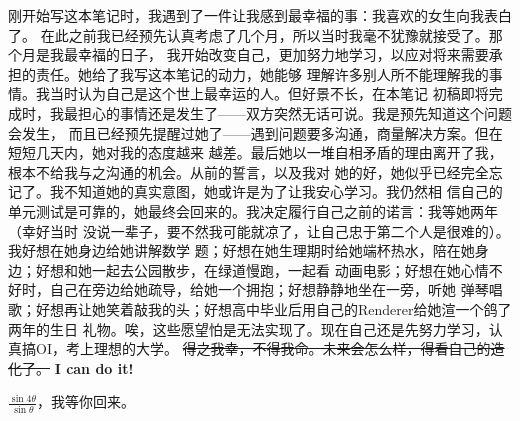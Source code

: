 刚开始写这本笔记时，我遇到了一件让我感到最幸福的事：我喜欢的女生向我表白了。
在此之前我已经预先认真考虑了几个月，所以当时我毫不犹豫就接受了。那个月是我最幸福的日子，
我开始改变自己，更加努力地学习，以应对将来需要承担的责任。她给了我写这本笔记的动力，她能够
理解许多别人所不能理解我的事情。我当时认为自己是这个世上最幸运的人。但好景不长，在本笔记
初稿即将完成时，我最担心的事情还是发生了——双方突然无话可说。我是预先知道这个问题会发生，
而且已经预先提醒过她了——遇到问题要多沟通，商量解决方案。但在短短几天内，她对我的态度越来
越差。最后她以一堆自相矛盾的理由离开了我，根本不给我与之沟通的机会。从前的誓言，以及我对
她的好，她似乎已经完全忘记了。我不知道她的真实意图，她或许是为了让我安心学习。我仍然相
信自己的单元测试是可靠的，她最终会回来的。我决定履行自己之前的诺言：我等她两年（幸好当时
没说一辈子，要不然我可能就凉了，让自己忠于第二个人是很难的）。我好想在她身边给她讲解数学
题；好想在她生理期时给她端杯热水，陪在她身边；好想和她一起去公园散步，在绿道慢跑，一起看
动画电影；好想在她心情不好时，自己在旁边给她疏导，给她一个拥抱；好想静静地坐在一旁，听她
弹琴唱歌；好想再让她笑着敲我的头；好想高中毕业后用自己的Renderer给她渲一个鸽了两年的生日
礼物。唉，这些愿望怕是无法实现了。现在自己还是先努力学习，认真搞OI，考上理想的大学。
\sout{得之我幸，不得我命。未来会怎么样，得看自己的造化了。}
\bfseries{I can do it!}

$\frac{\sin 4\theta}{\sin \theta}$，我等你回来。
